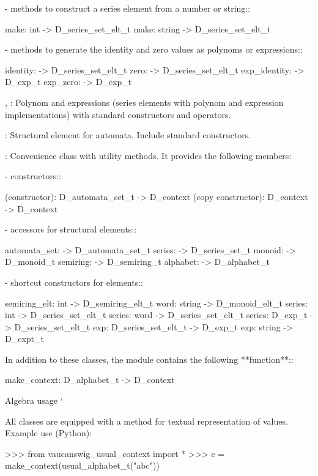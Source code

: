       - methods to construct a series element from a number or
        string::

          make: int -> D_series_set_elt_t
          make: string -> D_series_set_elt_t

      - methods to  generate the identity and zero  values as polynoms
        or expressions::

          identity: -> D_series_set_elt_t
          zero: -> D_series_set_elt_t
          exp_identity: -> D_exp_t
          exp_zero: -> D_exp_t

, : 
      Polynom  and  expressions  (series  elements  with  polynom  and
      expression implementations) with standard \Vauc constructors
      and operators.

:
      Structural  element  for  automata. Include  standard  \Vauc
      constructors.

:
      Convenience  class   with  utility  methods.   It  provides  the
      following members:

      - constructors::

         (constructor): D_automata_set_t -> D_context
         (copy constructor): D_context -> D_context

      - accessors for structural elements::

         automata_set: -> D_automata_set_t
         series: -> D_series_set_t
         monoid: -> D_monoid_t
         semiring: -> D_semiring_t
         alphabet: -> D_alphabet_t

      - shortcut constructors for elements::

         semiring_elt: int -> D_semiring_elt_t
         word: string -> D_monoid_elt_t
         series: int -> D_series_set_elt_t
         series: word -> D_series_set_elt_t
         series: D_exp_t -> D_series_set_elt_t
         exp: D_series_set_elt_t -> D_exp_t
         exp: string -> D_expt_t 

In  addition  to these  classes,  the module  
contains the following **function**::

    make_context: D_alphabet_t -> D_context

Algebra usage
\code{}\code{}\code{}`

All classes are equipped with a  method for
textual representation of values. Example use (Python):

  >>> from vaucanswig_usual_context import *
  >>> c = make_context(usual_alphabet_t("abc"))


